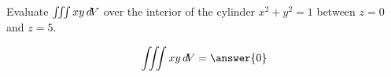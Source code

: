 \documentclass{ximera}
\author{David Guichard \and Neal Koblitz \and H. Jerome Keisler \and Albert Scheller \and Barry Balof \and Mike Wills \and Matthew Carr}
\begin{document}
\begin{exercise}




Evaluate $\iiint xy \mathop{}\!d\! V$ over the interior of the cylinder $x^2+y^2=1$ between $z=0$ and $z=5$.
\begin{prompt}
\[
\iiint xy \d V=\answer{0}
\]
\end{prompt}



\end{exercise}
\end{document}
